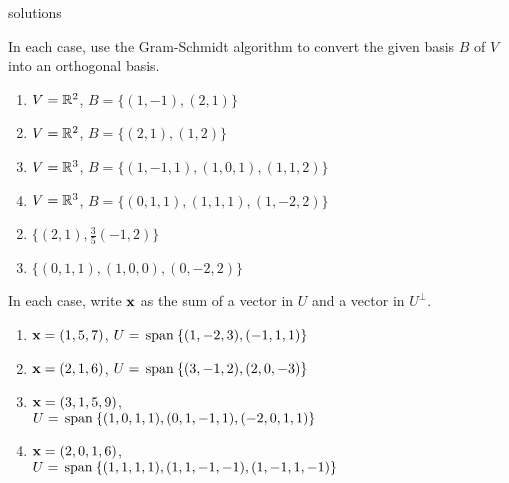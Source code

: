 \begin{Filesave}{solutions}
\end{Filesave}

\begin{multicols}{2}
\begin{ex}
In each case, use the Gram-Schmidt algorithm to convert the given basis $B$ of $V$ into an orthogonal basis.


\begin{enumerate}[label={\alph*.}]
\item $V = \mathbb{R}^2$, $B = \{(1, -1), (2, 1)\}$

\item $V = \mathbb{R}^2$, $B = \{(2, 1), (1, 2)\}$

\item $V = \mathbb{R}^3$, $B = \{(1, -1, 1), (1, 0, 1), (1, 1, 2)\}$

\item $V = \mathbb{R}^3$, $B = \{(0, 1, 1), (1, 1, 1), (1, -2, 2)\}$

\end{enumerate}
\begin{sol}
\begin{enumerate}[label={\alph*.}]
\setcounter{enumi}{1}
\item  $\{(2,1),\frac{3}{5}(-1,2)\}$

\setcounter{enumi}{3}
\item  $\{(0,1,1),(1,0,0),(0,-2,2)\}$

\end{enumerate}
\end{sol}
\end{ex}

\begin{ex}
In each case, write $\textbf{x}$ as the sum of a vector in $U$ and a vector in $U^\perp$.


\begin{enumerate}[label={\alph*.}, leftmargin=1em]
\item $\textbf{x} = (1, 5, 7)$, $U = \thinspace\operatorname{span\medspace}\{(1, -2, 3), (-1, 1, 1)\}$

\item $\textbf{x} = (2, 1, 6)$, $U = \thinspace\operatorname{span\medspace}\{(3, -1, 2), (2, 0, -3)\}$

\item $\textbf{x} = (3, 1, 5, 9)$, \\ $U = \thinspace\operatorname{span\medspace}\{(1, 0, 1, 1), (0, 1, -1, 1), (-2, 0, 1, 1)\}$

\item $\textbf{x} = (2, 0, 1, 6)$, \\ \hspace*{-1em}$U = \thinspace\operatorname{span\medspace}\{(1, 1, 1, 1), (1, 1, -1, -1), (1, -1, 1, -1)\}$


\end{enumerate}
\end{ex}
\end{multicols}
